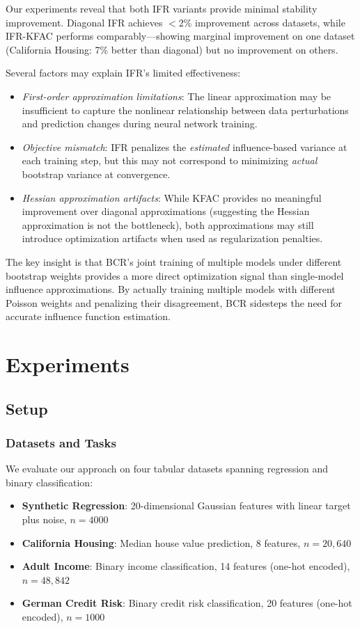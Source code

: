 \documentclass[12pt, letterpaper]{article}
\begin{document}
Our experiments reveal that both IFR variants provide minimal stability improvement. Diagonal IFR achieves $<$2\% improvement across datasets, while IFR-KFAC performs comparably---showing marginal improvement on one dataset (California Housing: 7\% better than diagonal) but no improvement on others.

Several factors may explain IFR's limited effectiveness:
\begin{itemize}
\item \emph{First-order approximation limitations}: The linear approximation may be insufficient to capture the nonlinear relationship between data perturbations and prediction changes during neural network training.
\item \emph{Objective mismatch}: IFR penalizes the \emph{estimated} influence-based variance at each training step, but this may not correspond to minimizing \emph{actual} bootstrap variance at convergence.
\item \emph{Hessian approximation artifacts}: While KFAC provides no meaningful improvement over diagonal approximations (suggesting the Hessian approximation is not the bottleneck), both approximations may still introduce optimization artifacts when used as regularization penalties.
\end{itemize}

The key insight is that BCR's joint training of multiple models under different bootstrap weights provides a more direct optimization signal than single-model influence approximations. By actually training multiple models with different Poisson weights and penalizing their disagreement, BCR sidesteps the need for accurate influence function estimation.

\section{Experiments}

\subsection{Setup}

\subsubsection{Datasets and Tasks}

We evaluate our approach on four tabular datasets spanning regression and binary classification:

\begin{itemize}
\item \textbf{Synthetic Regression}: 20-dimensional Gaussian features with linear target plus noise, $n=4000$
\item \textbf{California Housing}: Median house value prediction, 8 features, $n=20{,}640$
\item \textbf{Adult Income}: Binary income classification, 14 features (one-hot encoded), $n=48{,}842$
\item \textbf{German Credit Risk}: Binary credit risk classification, 20 features (one-hot encoded), $n=1000$
\end{itemize}
\end{document}
